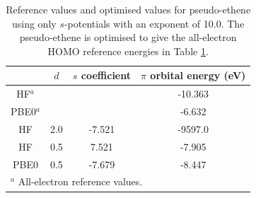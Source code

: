 \documentclass[journal=jctcce,manuscript=article]{achemso}
\begin{document}

\begin{table}[ht]
\caption{Reference values and optimised values for pseudo-ethene using only \(s\)-potentials with an exponent of 10.0. The pseudo-ethene is optimised to give the all-electron HOMO reference energies in Table \ref{table:ethene_s_pseudo}.}
\begin{tabular}{c c c c}
\hline
& $d$ & \(s\) coefficient & \( \pi \) orbital energy (eV) \\
\hline
HF$^a$   &     &        & -10.363 \\
PBE0$^a$ &     &        & -6.632 \\
HF       & 2.0 & -7.521 & -9597.0 \\
HF       & 0.5 & 7.521  & -7.905 \\
PBE0     & 0.5 &-7.679  & -8.447 \\
\hline
\multicolumn{4}{l}{$^a$ All-electron reference values.}\\
\end{tabular}
\label{table:ethene_s_pseudo}
\end{table}
\end{document}
